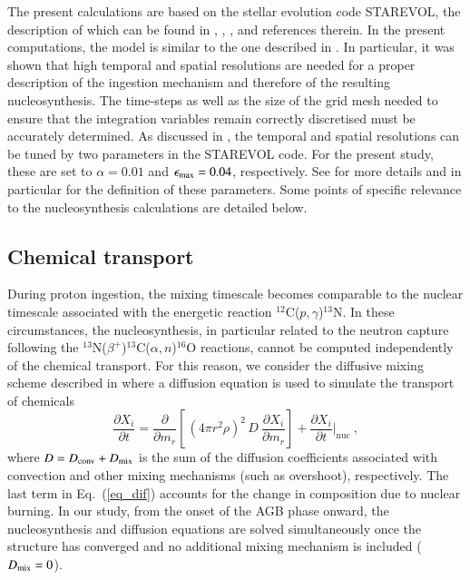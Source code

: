\documentclass{aa}
\def\iso#1{$^{#1}$}
\def\pg{$p,\gamma$}
\def\an{$\alpha,n$}
\def\conv{\mathrm{conv}}
\def\nuc{\mathrm{nuc}}
\begin{document}
The present calculations are based on the stellar evolution code  {\sf STAREVOL},  the description of which can be found in \cite{Siess00}, \cite{Siess06}, \cite{Goriely18c}, \cite{Choplin21} and references therein. In the present computations, the model is similar to the one described in \citet{Choplin21}.
In particular, it was shown that high temporal and spatial resolutions
are needed for a proper description of the ingestion mechanism and therefore
of the resulting nucleosynthesis. The time-steps as well as the size of the grid mesh needed to ensure that the integration variables remain correctly discretised must be accurately determined. As discussed in \cite{Choplin21}, the temporal and spatial resolutions can be tuned by two parameters in the  {\sf STAREVOL} code. For the present study, these are set to $\alpha=0.01$ and $\epsilon_{\rm max}=0.04$, respectively. See \citet{Choplin21} for more details and in particular for the definition of these parameters.
Some points of specific relevance to the nucleosynthesis calculations are detailed below.

\subsection{Chemical transport}
\label{sect_over}

During proton ingestion, the mixing timescale becomes comparable to the nuclear timescale associated with the energetic reaction \iso{12}C(\pg)\iso{13}N. In these circumstances, the nucleosynthesis,
in particular related to the neutron capture following the \iso{13}N($\beta^+$)\iso{13}C(\an)\iso{16}O reactions,
 cannot be computed independently of the chemical transport. For this reason, we consider the diffusive mixing scheme  described in \cite{Goriely18c} where a diffusion equation is used to simulate the transport of chemicals
\begin{equation}
\frac{\partial X_i}{\partial t}= \frac{\partial}{\partial m_r}  \left[\,(4 \pi r^2 \rho)^2\,D\ \frac{\partial X_i}{\partial m_r}\right] + \frac{\partial X_i}{\partial t}\bigg|_\nuc \ ,
\label{eq_dif}
\end{equation}
where $D = D_{\conv}+D_{\rm mix}$ is the sum of the diffusion coefficients associated with convection and other mixing mechanisms (such as overshoot), respectively. The last term in Eq.~(\ref{eq_dif}) accounts for the change in composition due to nuclear burning.
In our study, from the onset of the AGB phase onward, the nucleosynthesis and diffusion equations are solved simultaneously once the structure has converged and no additional mixing mechanism is included ($D_{\rm mix}=0$).
\end{document}
